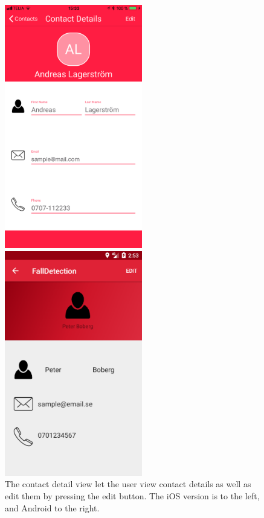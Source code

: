 \documentclass[12pt, a4paper, onecolumn]{article}
\begin{document}
	\begin{figure}[H]
		\begin{multicols}{2}
			\centering
			\includegraphics[width=6cm]{../img/screenshots/contacts-detail-screen.jpg}\par 
			\includegraphics[width=6cm]{../img/screenshots/contacts-detail-screen-android.png}\par 
		\end{multicols}
		\caption{The contact detail view let the user view contact details as well as edit them by pressing the edit button. The iOS version is to the left, and Android to the right.}%
		\label{fig:contacts-detail-screen}%
	\end{figure}
	
\end{document}
